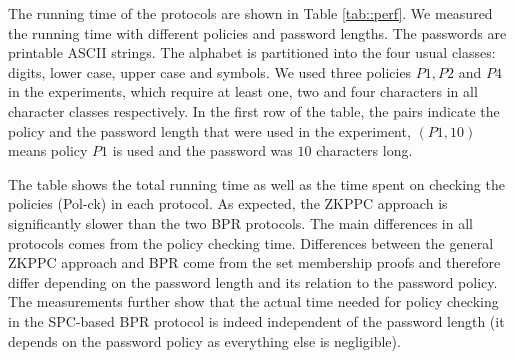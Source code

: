 \begin{table}[!t]
\begin{center}
\caption[BPR Protocol Performance]{Protocol Performance (Running Time in Milliseconds)} \label{tab::perf}
\end{center}
\end{table} 

The running time of the protocols are shown in Table \ref{tab::perf}. We measured the running time with different policies and password lengths. The passwords are printable \ac{ASCII} strings. 
The alphabet is partitioned into the four usual classes: digits, lower case, upper case and symbols. 
We used three policies $P1, P2$ and $P4$ in the experiments, which require at least one, two and four characters in all character classes respectively. 
In the first row of the table, the pairs indicate the policy and the password length that were used in the experiment, \eg $(P1, 10)$ means policy $P1$ is used and the password was $10$ characters long. 

The table shows the total running time as well as the time spent on checking the policies (Pol-ck) in each protocol. 
As expected, the \ac{ZKPPC} approach is significantly slower than the two \ac{BPR} protocols.
The main differences in all protocols comes from the policy checking time.
Differences between the general \ac{ZKPPC} approach and \ac{BPR} come from the set membership proofs and therefore differ depending on the password length and its relation to the password policy. 
The measurements further show that the actual time needed for policy checking in the \ac{SPC}-based \ac{BPR} protocol is indeed independent of the password length (it depends on the password policy as everything else is negligible).

